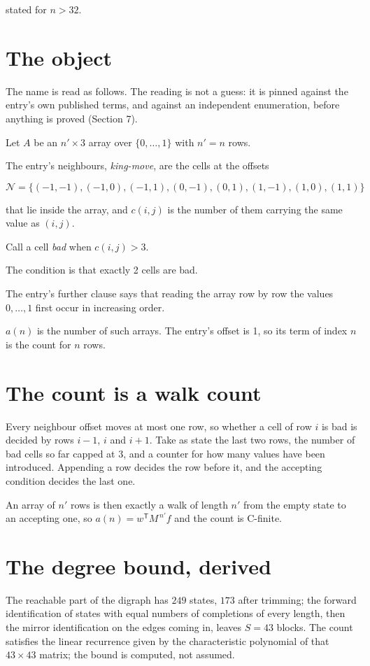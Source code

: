 \documentclass[11pt]{article}
\theoremstyle{definition}
\begin{document}
stated for $n > 32$.

\section{The object}

The name is read as follows. The reading is not a guess: it is pinned against the entry's own published terms, and against an independent enumeration, before anything is proved (Section 7).

Let $A$ be an $n' \times 3$ array over $\{0,\dots,1\}$ with $n' = n$ rows.

The entry's neighbours, {\itshape king-move}, are the cells at the offsets

\[\mathcal{N} = \{(-1,-1), (-1,0), (-1,1), (0,-1), (0,1), (1,-1), (1,0), (1,1)\}\]

that lie inside the array, and $c(i,j)$ is the number of them carrying the same value as $(i,j)$.

Call a cell {\itshape bad} when $c(i,j) > 3$.

The condition is that exactly 2 cells are bad.

The entry's further clause says that reading the array row by row the values $0,\dots,1$ first occur in increasing order.

$a(n)$ is the number of such arrays. The entry's offset is 1, so its term of index $n$ is the count for $n$ rows.

\section{The count is a walk count}

Every neighbour offset moves at most one row, so whether a cell of row $i$ is bad is decided by rows $i-1$, $i$ and $i+1$. Take as state the last two rows, the number of bad cells so far capped at 3, and a counter for how many values have been introduced. Appending a row decides the row before it, and the accepting condition decides the last one.

An array of $n'$ rows is then exactly a walk of length $n'$ from the empty state to an accepting one, so $a(n) = w^{\mathsf T}M^{\,n'}f$ and the count is C-finite.

\section{The degree bound, derived}

The reachable part of the digraph has $249$ states, $173$ after trimming; the forward identification of states with equal numbers of completions of every length, then the mirror identification on the edges coming in, leaves $S = 43$ blocks. The count satisfies the linear recurrence given by the characteristic polynomial of that $43\times43$ matrix; the bound is computed, not assumed.
\end{document}
